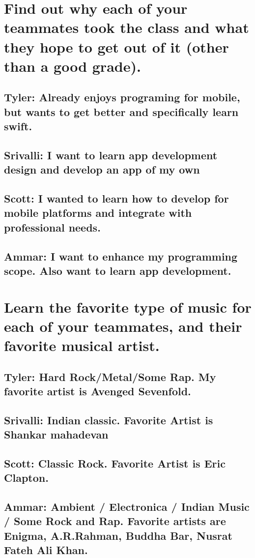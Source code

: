 \documentclass [10pt] {article}
\begin{document}
\section{Find out why each of your teammates took the class and what they hope to get out of it (other than a good grade).}
\subsection{Tyler: Already enjoys programing for mobile, but wants to get better and specifically learn swift.}
\subsection{Srivalli: I want to learn app development design and develop an app of my own}
\subsection{Scott: I wanted to learn how to develop for mobile platforms and integrate with professional needs.}
\subsection{Ammar: I want to enhance my programming scope. Also want to learn app development.}

\section{Learn the favorite type of music for each of your teammates, and their favorite musical artist.}
\subsection{Tyler: Hard Rock/Metal/Some Rap. My favorite artist is Avenged Sevenfold.}
\subsection{Srivalli: Indian classic. Favorite Artist is Shankar mahadevan}
\subsection{Scott: Classic Rock.  Favorite Artist is Eric Clapton.}
\subsection{Ammar: Ambient / Electronica / Indian Music / Some Rock and Rap. Favorite artists are Enigma, A.R.Rahman, Buddha Bar, Nusrat Fateh Ali Khan.}
\end{document}
